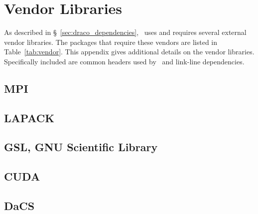 
\chapter{Vendor Libraries}
\label{app:vendor_libs}

As described in \S~\ref{sec:draco_dependencies}, \draco\ uses and
requires several external vendor libraries.  The packages that require
these vendors are listed in Table~\ref{tab:vendor}.  This appendix
gives additional details on the vendor libraries.  Specifically
included are common headers used by \draco\ and link-line
dependencies.


\section{MPI}
\label{appsec:mpi}


\section{LAPACK}
\label{appsec:lapack}


\section{GSL, GNU Scientific Library}
\label{appsec:gsl}


\section{CUDA}
\label{appsec:cuda}


\section{DaCS}
\label{appsec:dacs}

